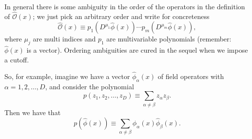 \documentclass[prl,twocolumn,lengthcheck,superscriptaddress]{revtex4-1}
\theoremstyle{definition}
\theoremstyle{remark}
\begin{document}
In general there is some ambiguity in the order of the operators in the definition of $\widehat{\mathcal{O}}(x)$; we just pick an arbitrary order and write for concreteness
\begin{equation}
	\widehat{\mathcal{O}}(x) \equiv p_1(D^{\mu_1}\widehat{\phi}(x))\cdots p_m(D^{\mu_m}\widehat{\phi}(x)),
\end{equation}
where $\mu_j$ are multi indices and $p_1$ are multivariable polynomials (remember: $\widehat{\phi}(x)$ is a vector). Ordering ambiguities are cured in the sequel when we impose a cutoff.

So, for example, imagine we have a vector $\widehat{\phi}_\alpha(x)$ of field operators with $\alpha = 1, 2, \ldots, D$, and consider the polynomial 
\begin{equation}
	p(z_1, z_2, \ldots, z_D) \equiv \sum_{\alpha\not=\beta} z_\alpha z_\beta.
\end{equation}
Then we have that
\begin{equation}
	p(\widehat{\phi}(x)) \equiv \sum_{\alpha\not=\beta} \widehat{\phi}_\alpha(x) \widehat{\phi}_\beta(x).
\end{equation}
\end{document}

